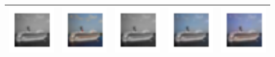 \documentclass{article}
\begin{document}
\begin{table}[h!]
\begin{tabular}{ccccc}
    \includegraphics[width=2cm]{results3/73-bw.png} & \includegraphics[width=2cm]{results3/73-gt.png} & \includegraphics[width=2cm]{results5/73-relucnn.png} & \includegraphics[width=2cm]{results5/73-tanhcnn.png} & \includegraphics[width=2cm]{results3/73-gan.png} \\
    \bottomrule
  \end{tabular}
\end{table}
\end{document}
